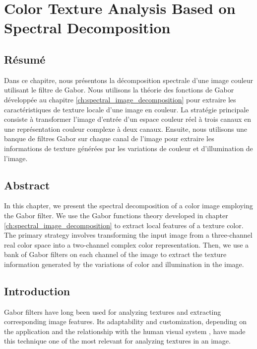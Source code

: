 
\chapter{Color Texture Analysis Based on Spectral Decomposition}\label{ch:complex_spectral_image_decomposition}
\section*{Résumé}
\noindent Dans ce chapitre, nous présentons la décomposition spectrale d'une image couleur utilisant le filtre de Gabor. Nous utilisons la théorie des fonctions de Gabor développée au chapitre \ref{ch:spectral_image_decomposition} pour extraire les caractéristiques de texture locale d'une image en couleur. La stratégie principale consiste à transformer l'image d'entrée d'un espace couleur réel à trois canaux en une représentation couleur complexe à deux canaux. Ensuite, nous utilisons une banque de filtres Gabor sur chaque canal de l'image pour extraire les informations de texture générées par les variations de couleur et d'illumination de l'image.

\section*{Abstract}
\noindent  In this chapter, we present the spectral decomposition of a color image employing the Gabor filter. We use the Gabor functions theory developed in chapter \ref{ch:spectral_image_decomposition} to extract local features of a texture color. The primary strategy involves transforming the input image from a three-channel real color space into a two-channel complex color representation. Then, we use a bank of Gabor filters on each channel of the image to extract the texture information generated by the variations of color and illumination in the image. 

\section{Introduction}

Gabor filters have long been used for analyzing textures and extracting corresponding image features. Its adaptability and customization, depending on the application and the relationship with the human visual system  \citep{Daugman:JOSA:1985a}, have made this technique one of the most relevant for analyzing textures in an image. 

